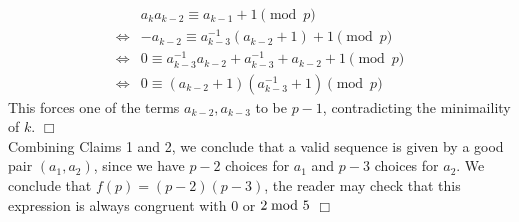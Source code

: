 \begin{solution}
        \begin{align*}
            &a_ka_{k-2} \equiv a_{k-1} + 1 \pmod p \\
            \iff& -a_{k-2} \equiv a_{k-3}^{-1}(a_{k-2}+1) + 1 \pmod p\\ 
            \iff& 0 \equiv a_{k-3}^{-1} a_{k-2} + a_{k-3}^{-1} + a_{k-2} + 1 \pmod p  \\
            \iff& 0 \equiv(a_{k-2} + 1) (a_{k-3}^{-1} + 1) \pmod p
        \end{align*}
        This forces one of the terms $a_{k-2}, a_{k-3}$ to be $p-1$, contradicting the minimaility of $k$. $\Box$ \\
        Combining Claims 1 and 2, we conclude that a valid sequence is given by a good pair $(a_1,a_2)$, since we have $p-2$ choices for $a_1$ and $p-3$ choices for $a_2$. We conclude that $f(p) = (p-2)(p-3)$, the reader may check that this expression is always congruent with 0 or $2 \hspace{-4pt}\mod 5$ $\Box$

\end{solution}




